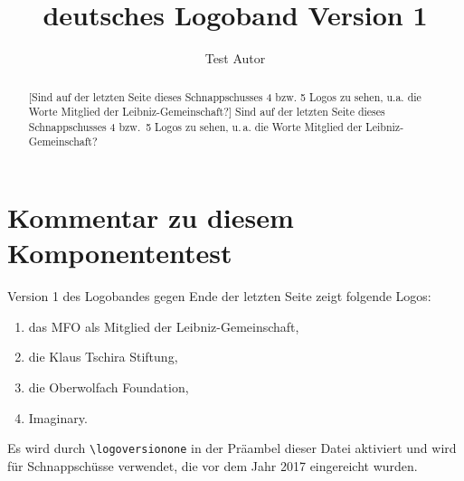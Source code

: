 \documentclass{snapshotmfo}
\author{Test Autor}
\title{deutsches Logoband Version 1}
\begin{document}
\begin{abstract}[Sind auf der letzten Seite dieses Schnappschusses 4 bzw. 5 Logos zu sehen, u.a. die Worte \glqq Mitglied der Leibniz-Gemeinschaft\grqq ?]
Sind auf der letzten Seite dieses Schnappschusses 4 bzw.\ 5 Logos zu sehen, u.\,a. die Worte \glqq Mitglied der Leibniz-Gemeinschaft\grqq ?
\end{abstract}

\section{Kommentar zu diesem Komponententest}
Version 1 des Logobandes gegen Ende der letzten Seite zeigt folgende Logos:
\begin{enumerate}
  \item das MFO als Mitglied der Leibniz-Gemeinschaft,
  \item die Klaus Tschira Stiftung,
  \item die Oberwolfach Foundation,
  \item Imaginary.
\end{enumerate}
Es wird durch \verb+\logoversionone+ in der Präambel dieser Datei aktiviert
und wird für Schnappschüsse verwendet, die vor dem Jahr 2017 eingereicht wurden.
\end{document}
